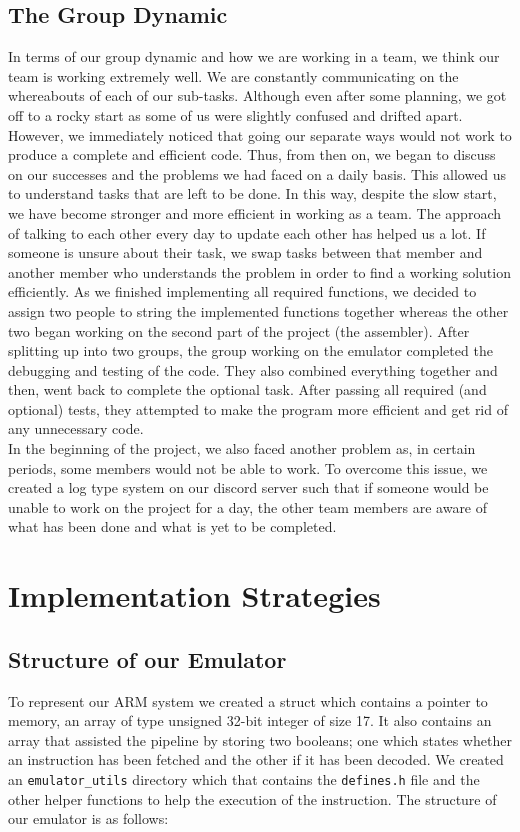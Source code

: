 \documentclass[10pt]{article}
\begin{document}
\subsection{The Group Dynamic}
In terms of our group dynamic and how we are working in a team, we think our team is working extremely well. We are constantly communicating on the whereabouts of each of our sub-tasks. Although even after some planning, we got off to a rocky start as some of us were slightly confused and drifted apart. However, we immediately noticed that going our separate ways would not work to produce a complete and efficient code. Thus, from then on, we began to discuss on our successes and the problems we had faced on a daily basis. This allowed us to understand tasks that are left to be done. In this way, despite the slow start, we have become stronger and more efficient in working as a team. 
 The approach of talking to each other every day to update each other has helped us a lot. If someone is unsure about their task, we swap tasks between that member and another member who understands the problem in order to find a working solution efficiently. As we finished implementing all required functions, we decided to assign two people to string the implemented functions together whereas the other two began working on the second part of the project (the assembler). After splitting up into two groups, the group working on the emulator completed the debugging and testing of the code. They also combined everything together and then, went back to complete the optional task. After passing all required (and optional) tests, they attempted to make the program more efficient and get rid of any unnecessary code.
\\In the beginning of the project, we also faced another problem as, in certain periods, some members would not be able to work. To overcome this issue, we created a log type system on our discord server such that if someone would be unable to work on the project for a day, the other team members are aware of what has been done and what is yet to be completed.

\section{Implementation Strategies}
\subsection{Structure of our Emulator}
To represent our ARM system we created a struct which contains a pointer to memory, an array of type unsigned 32-bit integer of size 17. It also contains an array that assisted the pipeline by storing two booleans; one which states whether an instruction has been fetched and the other if it has been decoded. We created an {\tt{emulator\_utils}} directory which that contains the {\tt{defines.h}} file and the other helper functions to help the execution of the instruction. The structure of our emulator is as follows:
\end{document}
